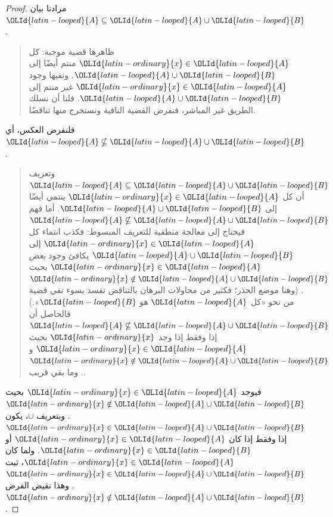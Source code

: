\documentclass[../../../include/open-logic-section]{subfiles}
\begin{document}
\begin{proof}
  مرادنا بيان $\OLId{latin-looped}{A} \subseteq \OLId{latin-looped}{A} \cup \OLId{latin-looped}{B}$.
  \begin{quote}
    ظاهرها قضية موجبة: كل $\OLId{latin-ordinary}{x} \in \OLId{latin-looped}{A}$ منتم أيضًا إلى $\OLId{latin-looped}{A} \cup \OLId{latin-looped}{B}$.
    ونفيها وجود $\OLId{latin-ordinary}{x} \in \OLId{latin-looped}{A}$ غير منتم إلى $\OLId{latin-looped}{A} \cup \OLId{latin-looped}{B}$. فلنا أن نسلك
    الطريق غير المباشر، فنفرض القضية النافية ونستخرج منها تناقضًا.
    \end{quote}
  فلنفرض العكس، أي $\OLId{latin-looped}{A} \nsubseteq \OLId{latin-looped}{A} \cup \OLId{latin-looped}{B}$.
  \begin{quote}
    وتعريف $\OLId{latin-looped}{A} \subseteq \OLId{latin-looped}{A} \cup \OLId{latin-looped}{B}$ أن كل $\OLId{latin-ordinary}{x} \in \OLId{latin-looped}{A}$ ينتمي أيضًا إلى
    $\OLId{latin-looped}{A} \cup \OLId{latin-looped}{B}$. أما فهم $\OLId{latin-looped}{A} \nsubseteq \OLId{latin-looped}{A} \cup \OLId{latin-looped}{B}$ فيحتاج إلى معالجة
    منطقية للتعريف المبسوط: فكذب انتماء كل $\OLId{latin-ordinary}{x} \in \OLId{latin-looped}{A}$ إلى
    $\OLId{latin-looped}{A} \cup \OLId{latin-looped}{B}$ يكافئ وجود \emph{بعض} $\OLId{latin-ordinary}{x} \in \OLId{latin-looped}{A}$ بحيث
    $\OLId{latin-ordinary}{x} \notin \OLId{latin-looped}{A} \cup \OLId{latin-looped}{B}$. (وهنا موضع الحذر؛ فكثير من محاولات البرهان
    بالتناقض تفسد بسوء نفي قضية من نحو «كل $\OLId{latin-looped}{A}$ هو $\OLId{latin-looped}{B}$».) فالحاصل أن
    $\OLId{latin-looped}{A} \nsubseteq \OLId{latin-looped}{A} \cup \OLId{latin-looped}{B}$ إذا وفقط إذا وجد $\OLId{latin-ordinary}{x}$ بحيث $\OLId{latin-ordinary}{x} \in \OLId{latin-looped}{A}$ و
    $\OLId{latin-ordinary}{x} \notin \OLId{latin-looped}{A} \cup \OLId{latin-looped}{B}$. وما بقي قريب.
  \end{quote}
  فيوجد $\OLId{latin-ordinary}{x} \in \OLId{latin-looped}{A}$ بحيث $\OLId{latin-ordinary}{x} \notin \OLId{latin-looped}{A} \cup \OLId{latin-looped}{B}$. وبتعريف $\cup$، يكون
  $\OLId{latin-ordinary}{x} \in \OLId{latin-looped}{A} \cup \OLId{latin-looped}{B}$ إذا وفقط إذا كان $\OLId{latin-ordinary}{x} \in \OLId{latin-looped}{A}$ أو $\OLId{latin-ordinary}{x} \in \OLId{latin-looped}{B}$.
  ولما كان $\OLId{latin-ordinary}{x} \in \OLId{latin-looped}{A}$، ثبت $\OLId{latin-ordinary}{x} \in \OLId{latin-looped}{A} \cup \OLId{latin-looped}{B}$. وهذا نقيض الفرض
  $\OLId{latin-ordinary}{x} \notin \OLId{latin-looped}{A} \cup \OLId{latin-looped}{B}$.
\end{proof}
\end{document}
